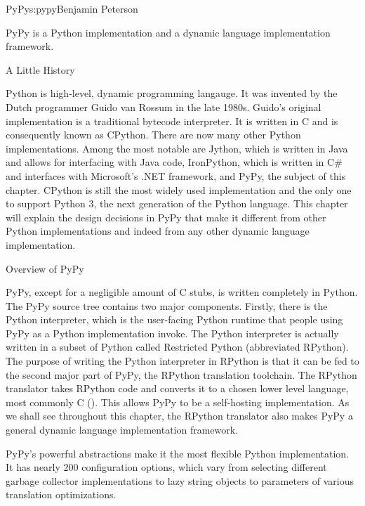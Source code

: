\begin{aosachapter}{PyPy}{s:pypy}{Benjamin Peterson}

PyPy is a Python implementation and a dynamic language implementation framework.

\begin{aosasect1}{A Little History}

Python is high-level, dynamic programming langauge. It was invented by the Dutch
programmer Guido van Rossum in the late 1980s. Guido's original implementation
is a traditional bytecode interpreter. It is written in C and is consequently
known as CPython. There are now many other Python implementations. Among the
most notable are Jython, which is written in Java and allows for interfacing
with Java code, IronPython, which is written in C\# and interfaces with
Microsoft's .NET framework, and PyPy, the subject of this chapter. CPython is
still the most widely used implementation and the only one to support Python 3,
the next generation of the Python language. This chapter will explain the design
decisions in PyPy that make it different from other Python implementations and
indeed from any other dynamic language implementation.

\end{aosasect1}

\begin{aosasect1}{Overview of PyPy}

PyPy, except for a negligible amount of C stubs, is written completely in
Python. The PyPy source tree contains two major components. Firstly, there is
the Python interpreter, which is the user-facing Python runtime that people
using PyPy as a Python implementation invoke. The Python interpreter is actually
written in a subset of Python called Restricted Python (abbreviated
RPython). The purpose of writing the Python interpreter in RPython is that it
can be fed to the second major part of PyPy, the RPython translation
toolchain. The RPython translator takes RPython code and converts it to a chosen
lower level language, most commonly C (). This allows
PyPy to be a self-hosting implementation. As we shall see throughout this
chapter, the RPython translator also makes PyPy a general dynamic language
implementation framework.


PyPy's powerful abstractions make it the most flexible Python implementation. It
has nearly 200 configuration options, which vary from selecting different
garbage collector implementations to lazy string objects to parameters of
various translation optimizations.


\end{aosasect1}
\end{aosachapter}
